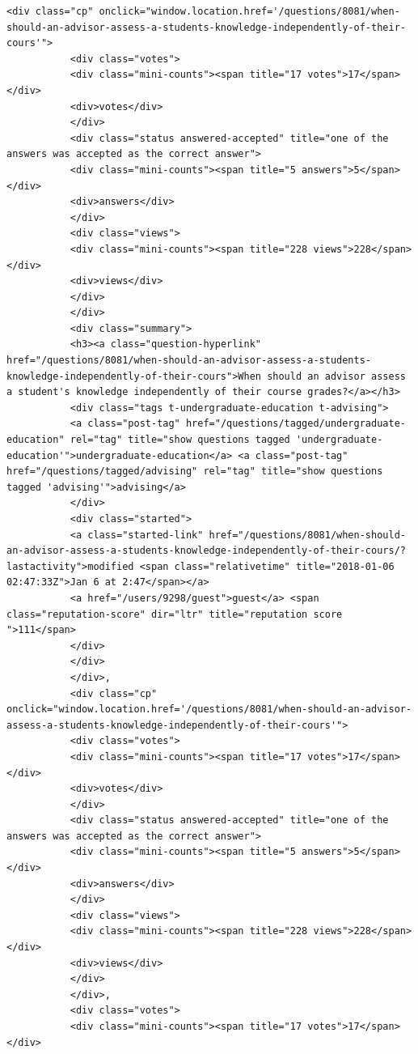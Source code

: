 \documentclass[11pt]{article}
\begin{document}
\begin{Verbatim}[commandchars=\\\{\}]
           <div class="cp" onclick="window.location.href='/questions/8081/when-should-an-advisor-assess-a-students-knowledge-independently-of-their-cours'">
           <div class="votes">
           <div class="mini-counts"><span title="17 votes">17</span></div>
           <div>votes</div>
           </div>
           <div class="status answered-accepted" title="one of the answers was accepted as the correct answer">
           <div class="mini-counts"><span title="5 answers">5</span></div>
           <div>answers</div>
           </div>
           <div class="views">
           <div class="mini-counts"><span title="228 views">228</span></div>
           <div>views</div>
           </div>
           </div>
           <div class="summary">
           <h3><a class="question-hyperlink" href="/questions/8081/when-should-an-advisor-assess-a-students-knowledge-independently-of-their-cours">When should an advisor assess a student's knowledge independently of their course grades?</a></h3>
           <div class="tags t-undergraduate-education t-advising">
           <a class="post-tag" href="/questions/tagged/undergraduate-education" rel="tag" title="show questions tagged 'undergraduate-education'">undergraduate-education</a> <a class="post-tag" href="/questions/tagged/advising" rel="tag" title="show questions tagged 'advising'">advising</a>
           </div>
           <div class="started">
           <a class="started-link" href="/questions/8081/when-should-an-advisor-assess-a-students-knowledge-independently-of-their-cours/?lastactivity">modified <span class="relativetime" title="2018-01-06 02:47:33Z">Jan 6 at 2:47</span></a>
           <a href="/users/9298/guest">guest</a> <span class="reputation-score" dir="ltr" title="reputation score ">111</span>
           </div>
           </div>
           </div>,
           <div class="cp" onclick="window.location.href='/questions/8081/when-should-an-advisor-assess-a-students-knowledge-independently-of-their-cours'">
           <div class="votes">
           <div class="mini-counts"><span title="17 votes">17</span></div>
           <div>votes</div>
           </div>
           <div class="status answered-accepted" title="one of the answers was accepted as the correct answer">
           <div class="mini-counts"><span title="5 answers">5</span></div>
           <div>answers</div>
           </div>
           <div class="views">
           <div class="mini-counts"><span title="228 views">228</span></div>
           <div>views</div>
           </div>
           </div>,
           <div class="votes">
           <div class="mini-counts"><span title="17 votes">17</span></div>

\end{Verbatim}
\end{document}
